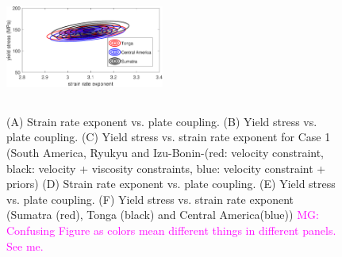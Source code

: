 \documentclass[12pt]{article}
\newcommand{\mgnote}[1]{\textcolor{magenta}{MG: #1}}
\begin{document}
\begin{figure}[H]
{\includegraphics[height=35mm,width=52mm]{fig3new.pdf}%
}
\caption{(A) Strain rate exponent vs. plate coupling. 
(B) Yield stress vs. plate coupling. 
(C) Yield stress vs. strain rate exponent for Case 1 (South America, Ryukyu and Izu-Bonin-(red: velocity constraint, black: velocity + viscosity constraints, blue: velocity constraint + priors) 
(D) Strain rate exponent vs. plate coupling. 
(E) Yield stress vs. plate coupling. 
(F) Yield stress vs. strain rate exponent  (Sumatra (red), Tonga (black) and Central America(blue))
\mgnote{Confusing Figure as colors mean different things in different panels. See me.}}
\label{fig:distrib}
\end{figure}

\end{document}
